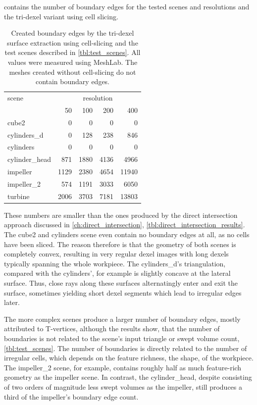  contains the number of boundary edges for the tested scenes and resolutions and the tri-dexel variant using cell slicing.
%
\begin{table}
	\centering
	\begin{tabular}{l|r|r|r|r}
		scene          & \multicolumn{4}{|c}{resolution} \\
		               &   50 &  100 &  200 &   400 \\
		\midrule
		cube2          &    0 &    0 &    0 &     0 \\
		cylinders\_d   &    0 &  128 &  238 &   846 \\
		cylinders      &    0 &    0 &    0 &     0 \\
		cylinder\_head &  871 & 1880 & 4136 &  4966 \\
		impeller       & 1129 & 2380 & 4654 & 11940 \\
		impeller\_2    &  574 & 1191 & 3033 &  6050 \\
		turbine        & 2006 & 3703 & 7181 & 13803 \\
	\end{tabular}
	\caption{
		Created boundary edges by the tri-dexel surface extraction using cell-slicing and the test scenes described in \cref{tbl:test_scenes}.
		All values were measured using MeshLab.
		The meshes created without cell-slicing do not contain boundary edges.
	}
	\label{tbl:tri_dexel_boundary edges}
\end{table}
%
These numbers are smaller than the ones produced by the direct intersection approach discussed in \cref{ch:direct_intersection}, \cf \cref{tbl:direct_intersection_results}.
The cube2 and cylinders scene even contain no boundary edges at all, as no cells have been sliced.
The reason therefore is that the geometry of both scenes is completely convex, resulting in very regular dexel images with long dexels typically spanning the whole workpiece.
The cylinders\_d's triangulation, compared with the cylinders', for example is slightly concave at the lateral surface.
Thus, close rays along these surfaces alternatingly enter and exit the surface, sometimes yielding short dexel segments which lead to irregular edges later.

The more complex scenes produce a larger number of boundary edges, mostly attributed to T-vertices, although the results show, that the number of boundaries is not related to the scene's input triangle or swept volume count, \cf \cref{tbl:test_scenes}.
The number of boundaries is directly related to the number of irregular cells, which depends on the feature richness, \ie the shape, of the workpiece.
The impeller\_2 scene, for example, contains roughly half as much feature-rich geometry as the impeller scene.
In contrast, the cylinder\_head, despite consisting of two orders of magnitude less swept volumes as the impeller, still produces a third of the impeller's boundary edge count.

